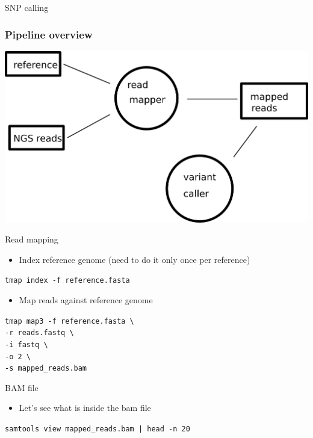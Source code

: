 \documentclass{beamer}
\newcommand{\refindex}[1]{\texttt{tmap index -f #1}}
\newcommand{\tmap}[3]{\texttt{tmap map3 -f #1 \textbackslash \\
    -r #2 \textbackslash \\
    -i fastq \textbackslash \\
    -o 2 \textbackslash \\
    -s #3
  }
}
\begin{document}
\begin{frame}{SNP calling}
  \frametitle{Pipeline overview}
  \includegraphics[width=\linewidth, keepaspectratio]{pic/pipe_overview.png}
\end{frame}

\begin{frame}{Read mapping}
  \begin{itemize}
    \item Index reference genome (need to do it only once per reference)
  \end{itemize}
  \refindex{reference.fasta}
  \pause
  \begin{itemize}
    \item Map reads against reference genome
  \end{itemize}
  \tmap{reference.fasta}{reads.fastq}{mapped\_reads.bam}
\end{frame}

\begin{frame}{BAM file}
  \begin{itemize}
    \item Let's see what is inside the bam file
  \end{itemize}
  \texttt{samtools view mapped\_reads.bam | head -n 20}
\end{frame}

{
\begin{frame}[plain]
\end{frame}
}
\end{document}
